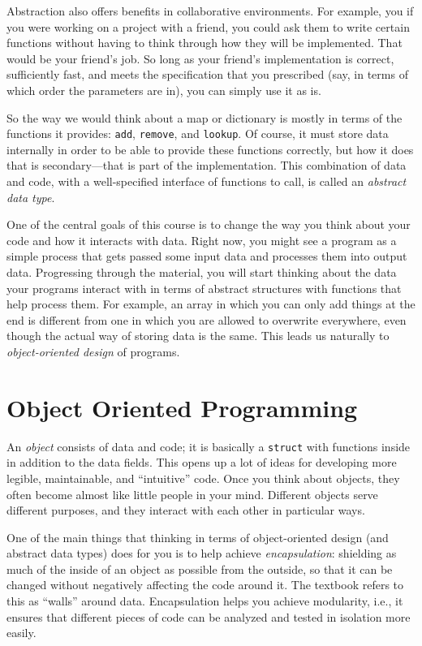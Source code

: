 Abstraction also offers benefits in collaborative environments.
For example, you if you were working on a project with a friend, you could ask them to write certain functions without having to think through how they will be implemented.
That would be your friend's job.
So long as your friend's implementation is correct, sufficiently fast, and meets the specification that you prescribed (say, in terms of which order the parameters are in), you can simply use it as is.

So the way we would think about a map or dictionary is mostly in terms of the functions it provides: \texttt{add}, \texttt{remove}, and \texttt{lookup}.
Of course, it must store data internally in order to be able to provide these functions correctly, but how it does that is secondary---that is part of the implementation.
This combination of data and code, with a well-specified interface of functions to call, is called an \emph{abstract data type}.

One of the central goals of this course is to change the way you think about your code and how it interacts with data.
Right now, you might see a program as a simple process that gets passed some input data and processes them into output data.
Progressing through the material, you will start thinking about the data your programs interact with in terms of abstract structures with functions that help process them.
For example, an array in which you can only add things at the end is different from one in which you are allowed to overwrite everywhere, even though the actual way of storing data is the same.
This leads us naturally to \emph{object-oriented design} of programs. 

\section{Object Oriented Programming}

An \emph{object} consists of data and code; it is basically a
\texttt{struct} with functions inside in addition to the data fields. 
This opens up a lot of ideas for developing more legible,
maintainable, and ``intuitive'' code.
Once you think about objects, they often become almost like little
people in your mind.
Different objects serve different purposes,
and they interact with each other in particular ways.

One of the main things that thinking in terms of object-oriented
design (and abstract data types) does for you is to help achieve 
\emph{encapsulation}: shielding as much of the inside of an object as
possible from the outside, so that it can be changed without
negatively affecting the code around it.
The textbook refers to this as ``walls'' around data.
Encapsulation helps you achieve modularity, i.e., it ensures that
different pieces of code can be analyzed and tested in isolation more 
easily.


